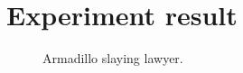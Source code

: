 \chapter{Experiment result}

\vspace*{-3in}

\begin{figure}
\vspace{2.4in}
\caption{Armadillo slaying lawyer.}
\label{arm:fig1}
\end{figure}
